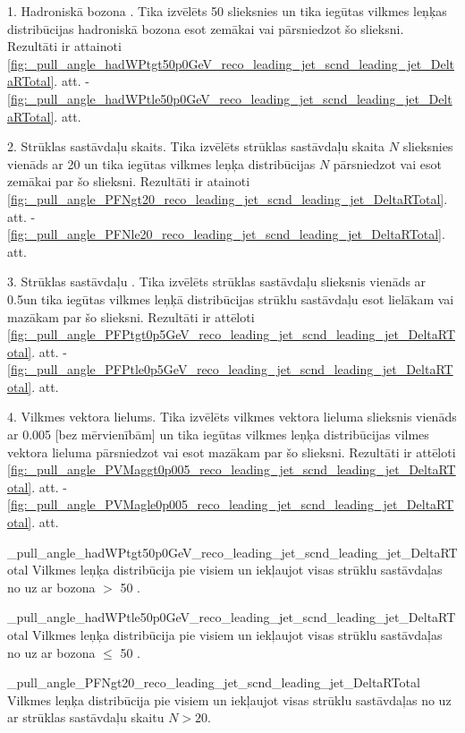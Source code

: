 1. Hadroniskā \PW bozona \pt. Tika izvēlēts 50 \GeV slieksnies un tika iegūtas vilkmes leņķas distribūcijas hadroniskā \PW bozona \pt esot zemākai vai pārsniedzot šo slieksni. Rezultāti ir attainoti \ref{fig:_pull_angle_hadWPtgt50p0GeV_reco_leading_jet_scnd_leading_jet_DeltaRTotal}. att. - \ref{fig:_pull_angle_hadWPtle50p0GeV_reco_leading_jet_scnd_leading_jet_DeltaRTotal}. att.

2. Strūklas sastāvdaļu skaits. Tika izvēlēts strūklas sastāvdaļu skaita $N$ slieksnies vienāds ar 20 un tika iegūtas vilkmes leņķa distribūcijas $N$ pārsniedzot vai esot zemākai par šo slieksni. Rezultāti ir atainoti \ref{fig:_pull_angle_PFNgt20_reco_leading_jet_scnd_leading_jet_DeltaRTotal}. att. - \ref{fig:_pull_angle_PFNle20_reco_leading_jet_scnd_leading_jet_DeltaRTotal}. att.
                                        
3. Strūklas sastāvdaļu \pt. Tika izvēlēts strūklas sastāvdaļu \pt slieksnis vienāds ar 0.5\GeV un tika iegūtas vilkmes leņķā distribūcijas strūklu sastāvdaļu \pt esot lielākam vai mazākam par šo slieksni. Rezultāti ir attēloti \ref{fig:_pull_angle_PFPtgt0p5GeV_reco_leading_jet_scnd_leading_jet_DeltaRTotal}. att. - \ref{fig:_pull_angle_PFPtle0p5GeV_reco_leading_jet_scnd_leading_jet_DeltaRTotal}. att.

4. Vilkmes vektora lielums.  Tika izvēlēts vilkmes vektora lieluma slieksnis vienāds ar 0.005 [bez mērvienībām] un tika iegūtas vilkmes leņķa distribūcijas vilmes vektora lieluma pārsniedzot vai esot mazākam par šo slieksni. Rezultāti ir attēloti \ref{fig:_pull_angle_PVMaggt0p005_reco_leading_jet_scnd_leading_jet_DeltaRTotal}. att. - \ref{fig:_pull_angle_PVMagle0p005_reco_leading_jet_scnd_leading_jet_DeltaRTotal}. att.


          {_pull_angle_hadWPtgt50p0GeV_reco_leading_jet_scnd_leading_jet_DeltaRTotal}
          {Vilkmes leņķa distribūcija pie visiem \DeltaR un iekļaujot visas strūklu sastāvdaļas no \leadingjet uz \scndleadingjet ar \PW bozona \pt $>$ 50 \GeV.}

          {_pull_angle_hadWPtle50p0GeV_reco_leading_jet_scnd_leading_jet_DeltaRTotal}
          {Vilkmes leņķa distribūcija pie visiem \DeltaR un iekļaujot visas strūklu sastāvdaļas no \leadingjet uz \scndleadingjet ar \PW bozona \pt $\leq$ 50 \GeV.}
          

          {_pull_angle_PFNgt20_reco_leading_jet_scnd_leading_jet_DeltaRTotal}
          {Vilkmes leņķa distribūcija pie visiem \DeltaR un iekļaujot visas strūklu sastāvdaļas no \leadingjet uz \scndleadingjet ar strūklas sastāvdaļu skaitu $N>20$.}


